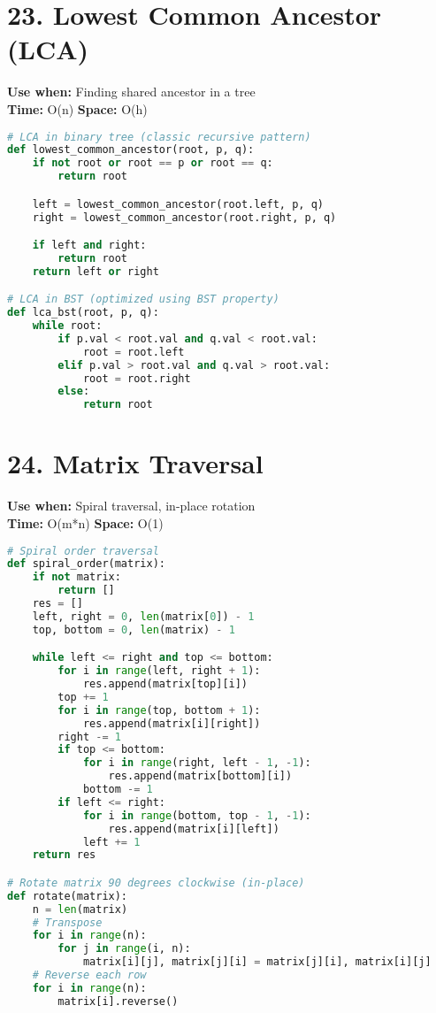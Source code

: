 \documentclass[8pt,landscape]{article}
\begin{document}
\begin{multicols}{3}
\section*{23. Lowest Common Ancestor (LCA)}
\textbf{Use when:} Finding shared ancestor in a tree \\
\textbf{Time:} O(n) \quad \textbf{Space:} O(h)
\begin{lstlisting}[language=Python]
# LCA in binary tree (classic recursive pattern)
def lowest_common_ancestor(root, p, q):
    if not root or root == p or root == q:
        return root

    left = lowest_common_ancestor(root.left, p, q)
    right = lowest_common_ancestor(root.right, p, q)

    if left and right:
        return root
    return left or right

# LCA in BST (optimized using BST property)
def lca_bst(root, p, q):
    while root:
        if p.val < root.val and q.val < root.val:
            root = root.left
        elif p.val > root.val and q.val > root.val:
            root = root.right
        else:
            return root
\end{lstlisting}

\section*{24. Matrix Traversal}
\textbf{Use when:} Spiral traversal, in-place rotation \\
\textbf{Time:} O(m*n) \quad \textbf{Space:} O(1)
\begin{lstlisting}[language=Python]
# Spiral order traversal
def spiral_order(matrix):
    if not matrix:
        return []
    res = []
    left, right = 0, len(matrix[0]) - 1
    top, bottom = 0, len(matrix) - 1

    while left <= right and top <= bottom:
        for i in range(left, right + 1):
            res.append(matrix[top][i])
        top += 1
        for i in range(top, bottom + 1):
            res.append(matrix[i][right])
        right -= 1
        if top <= bottom:
            for i in range(right, left - 1, -1):
                res.append(matrix[bottom][i])
            bottom -= 1
        if left <= right:
            for i in range(bottom, top - 1, -1):
                res.append(matrix[i][left])
            left += 1
    return res

# Rotate matrix 90 degrees clockwise (in-place)
def rotate(matrix):
    n = len(matrix)
    # Transpose
    for i in range(n):
        for j in range(i, n):
            matrix[i][j], matrix[j][i] = matrix[j][i], matrix[i][j]
    # Reverse each row
    for i in range(n):
        matrix[i].reverse()
\end{lstlisting}


\end{multicols}
\end{document}
